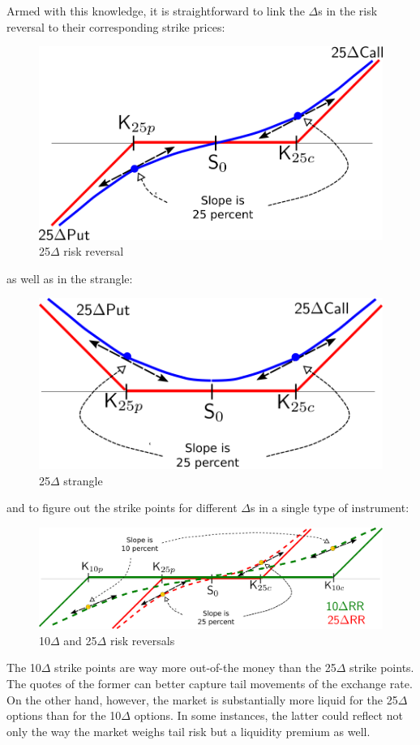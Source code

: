 \documentclass[]{book}
\theoremstyle{definition}
\theoremstyle{definition}
\theoremstyle{definition}
\theoremstyle{remark}
\begin{document}
Armed with this knowledge, it is straightforward to link the \(\Delta\)s
in the risk reversal to their corresponding strike prices:

\begin{figure}
\includegraphics[width=0.6\linewidth]{images/fig25RR} \caption{25$\Delta$ risk reversal}\label{fig:unnamed-chunk-20}
\end{figure}

as well as in the strangle:

\begin{figure}
\includegraphics[width=0.6\linewidth]{images/fig25Strangle} \caption{25$\Delta$ strangle}\label{fig:unnamed-chunk-21}
\end{figure}

and to figure out the strike points for different \(\Delta\)s in a
single type of instrument:

\begin{figure}
\includegraphics[width=0.8\linewidth]{images/fig1025RR} \caption{10$\Delta$ and 25$\Delta$ risk reversals}\label{fig:unnamed-chunk-22}
\end{figure}

The 10\(\Delta\) strike points are way more out-of-the money than the
25\(\Delta\) strike points. The quotes of the former can better capture
tail movements of the exchange rate. On the other hand, however, the
market is substantially more liquid for the 25\(\Delta\) options than
for the 10\(\Delta\) options. In some instances, the latter could
reflect not only the way the market weighs tail risk but a liquidity
premium as well.
\end{document}

